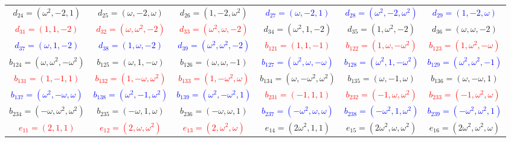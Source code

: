 \documentclass[%
  reprint,
  superscriptaddress,
  showkeys,
  amsmath,amssymb,
  aps,pra,
  longbibliography,
  floatfix,
  x11names
]{revtex4-2}
\begin{document}
\begin{table}[htbp!]
\begin{ruledtabular}
\begin{tabular}{*{6}{c}}
\textcolor{green!40!black}{$d_{24}=(\omega^2,-2,1)$} & \textcolor{green!40!black}{$d_{25}=(\omega,-2,\omega)$} & \textcolor{green!40!black}{$d_{26}=(1,-2,\omega^2)$} & \textcolor{blue}{$d_{27}=(\omega,-2,1)$} & \textcolor{blue}{$d_{28}=(\omega^2,-2,\omega^2)$} & \textcolor{blue}{$d_{29}=(1,-2,\omega)$} \\
\textcolor{red}{$d_{31}=(1,1,-2)$} & \textcolor{red}{$d_{32}=(\omega,\omega^2,-2)$} & \textcolor{red}{$d_{33}=(\omega^2,\omega,-2)$} & \textcolor{green!40!black}{$d_{34}=(\omega^2,1,-2)$} & \textcolor{green!40!black}{$d_{35}=(1,\omega^2,-2)$} & \textcolor{green!40!black}{$d_{36}=(\omega,\omega,-2)$} \\
\textcolor{blue}{$d_{37}=(\omega,1,-2)$} & \textcolor{blue}{$d_{38}=(1,\omega,-2)$} & \textcolor{blue}{$d_{39}=(\omega^2,\omega^2,-2)$} & \textcolor{red}{$b_{121}=(1,1,-1)$} & \textcolor{red}{$b_{122}=(1,\omega,-\omega^2)$} & \textcolor{red}{$b_{123}=(1,\omega^2,-\omega)$} \\
\textcolor{green!40!black}{$b_{124}=(\omega,\omega^2,-\omega^2)$} & \textcolor{green!40!black}{$b_{125}=(\omega,1,-\omega)$} & \textcolor{green!40!black}{$b_{126}=(\omega,\omega,-1)$} & \textcolor{blue}{$b_{127}=(\omega^2,\omega,-\omega)$} & \textcolor{blue}{$b_{128}=(\omega^2,1,-\omega^2)$} & \textcolor{blue}{$b_{129}=(\omega^2,\omega^2,-1)$} \\
\textcolor{red}{$b_{131}=(1,-1,1)$} & \textcolor{red}{$b_{132}=(1,-\omega,\omega^2)$} & \textcolor{red}{$b_{133}=(1,-\omega^2,\omega)$} & \textcolor{green!40!black}{$b_{134}=(\omega,-\omega^2,\omega^2)$} & \textcolor{green!40!black}{$b_{135}=(\omega,-1,\omega)$} & \textcolor{green!40!black}{$b_{136}=(\omega,-\omega,1)$} \\
\textcolor{blue}{$b_{137}=(\omega^2,-\omega,\omega)$} & \textcolor{blue}{$b_{138}=(\omega^2,-1,\omega^2)$} & \textcolor{blue}{$b_{139}=(\omega^2,-\omega^2,1)$} & \textcolor{red}{$b_{231}=(-1,1,1)$} & \textcolor{red}{$b_{232}=(-1,\omega,\omega^2)$} & \textcolor{red}{$b_{233}=(-1,\omega^2,\omega)$} \\
\textcolor{green!40!black}{$b_{234}=(-\omega,\omega^2,\omega^2)$} & \textcolor{green!40!black}{$b_{235}=(-\omega,1,\omega)$} & \textcolor{green!40!black}{$b_{236}=(-\omega,\omega,1)$} & \textcolor{blue}{$b_{237}=(-\omega^2,\omega,\omega)$} & \textcolor{blue}{$b_{238}=(-\omega^2,1,\omega^2)$} & \textcolor{blue}{$b_{239}=(-\omega^2,\omega^2,1)$} \\
\textcolor{red}{$e_{11}=(2,1,1)$} & \textcolor{red}{$e_{12}=(2,\omega,\omega^2)$} & \textcolor{red}{$e_{13}=(2,\omega^2,\omega)$} & \textcolor{green!40!black}{$e_{14}=(2\omega^2,1,1)$} & \textcolor{green!40!black}{$e_{15}=(2\omega^2,\omega,\omega^2)$} & \textcolor{green!40!black}{$e_{16}=(2\omega^2,\omega^2,\omega)$} \\

\end{tabular}
\end{ruledtabular}
\end{table}
\end{document}
